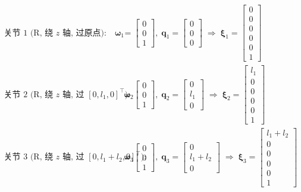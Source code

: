 \documentclass[12pt,a4paper]{ctexart}
\begin{document}
\begin{conceptbox}[关节旋量 $\bm{\xi}_i$]
\begin{align*}
\text{关节 1 (R, 绕 $z$ 轴, 过原点):}\quad
  \bm{\omega}_1 &= \begin{bmatrix}0\\0\\1\end{bmatrix},\;
  \mathbf{q}_1 = \begin{bmatrix}0\\0\\0\end{bmatrix}
  \;\Rightarrow\; \bm{\xi}_1 = \begin{bmatrix}0\\0\\0\\0\\0\\1\end{bmatrix} \\[5pt]
\text{关节 2 (R, 绕 $z$ 轴, 过 $[0,l_1,0]^\top$):}\quad
  \bm{\omega}_2 &= \begin{bmatrix}0\\0\\1\end{bmatrix},\;
  \mathbf{q}_2 = \begin{bmatrix}0\\l_1\\0\end{bmatrix}
  \;\Rightarrow\; \bm{\xi}_2 = \begin{bmatrix}l_1\\0\\0\\0\\0\\1\end{bmatrix} \\[5pt]
\text{关节 3 (R, 绕 $z$ 轴, 过 $[0,l_1+l_2,0]^\top$):}\quad
  \bm{\omega}_3 &= \begin{bmatrix}0\\0\\1\end{bmatrix},\;
  \mathbf{q}_3 = \begin{bmatrix}0\\l_1+l_2\\0\end{bmatrix}
  \;\Rightarrow\; \bm{\xi}_3 = \begin{bmatrix}l_1+l_2\\0\\0\\0\\0\\1\end{bmatrix} \\[5pt]

\end{align*}
\end{conceptbox}
\end{document}
